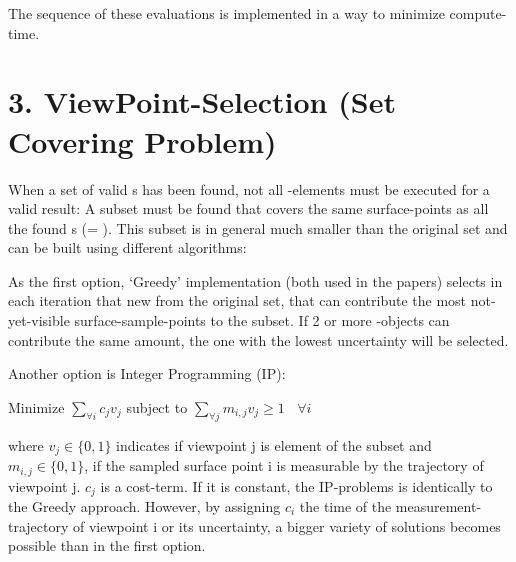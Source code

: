 \documentclass[letterpaper,10pt,english]{sphinxmanual}
\begin{document}
\begin{figure}[htbp]
\centering

\noindent{}
\end{figure}

The sequence of these evaluations is implemented in a way to minimize compute-time.


\section{3. ViewPoint-Selection (Set Covering Problem)}
\label{\detokenize{view_planning_detailed:viewpoint-selection-set-covering-problem}}
When a set of valid {\hyperref[\detokenize{module_view:viewpoint}]{}} s has been found, not all {\hyperref[\detokenize{module_view:viewpoint}]{}} -elements must be executed for a valid result: A subset must be found that
covers the same surface-points as all the found {\hyperref[\detokenize{module_view:viewpoint}]{}} s (= ). This subset is in general much smaller than the original set and can be built using different algorithms:

As the first option, ‘Greedy’ implementation (both used in the papers) selects in each iteration that new {\hyperref[\detokenize{module_view:viewpoint}]{}} from the original set, that can contribute the most
not-yet-visible surface-sample-points to the subset. If 2 or more {\hyperref[\detokenize{module_view:viewpoint}]{}} -objects can contribute the same amount, the one with the lowest uncertainty will be selected.

Another option is Integer Programming (IP):

Minimize \(\sum_{\forall i} c_j v_j\) subject to \(\sum_{\forall j} m_{i,j} v_j \ge 1~~~~\forall i\)

where \(v_j \in \{0,1\}\) indicates if viewpoint j is element of the subset and \(m_{i,j} \in \{0, 1\}\), if the sampled surface point i is measurable by the trajectory of viewpoint j.
\(c_{j}\) is a cost-term. If it is constant, the IP-problems is identically to the Greedy approach. However, by assigning \(c_{i}\) the time of the measurement-trajectory
of viewpoint i or its uncertainty, a bigger variety of solutions becomes possible than in the first option.
\end{document}
